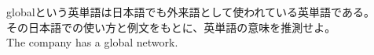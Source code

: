 \documentclass{jarticle}
\begin{document}
\vspace*{\fill}
\begin{center}
globalという英単語は日本語でも外来語として使われている英単語である。\\
その日本語での使い方と例文をもとに、英単語の意味を推測せよ。\\
The company has a global network.
\end{center}
\vspace*{\fill}
\end{document}

